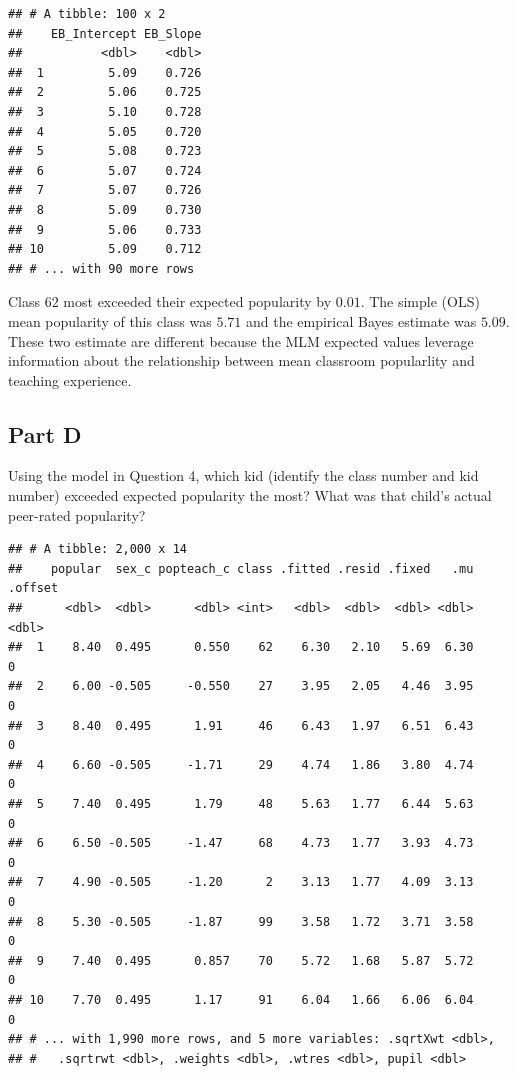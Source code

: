\documentclass[]{article}
\newenvironment{Shaded}{\begin{snugshade}}{\end{snugshade}}
\newcommand{\KeywordTok}[1]{\textcolor[rgb]{0.13,0.29,0.53}{\textbf{#1}}}
\newcommand{\DataTypeTok}[1]{\textcolor[rgb]{0.13,0.29,0.53}{#1}}
\newcommand{\StringTok}[1]{\textcolor[rgb]{0.31,0.60,0.02}{#1}}
\newcommand{\OperatorTok}[1]{\textcolor[rgb]{0.81,0.36,0.00}{\textbf{#1}}}
\newcommand{\NormalTok}[1]{#1}
\begin{document}
\begin{verbatim}
## # A tibble: 100 x 2
##    EB_Intercept EB_Slope
##           <dbl>    <dbl>
##  1         5.09    0.726
##  2         5.06    0.725
##  3         5.10    0.728
##  4         5.05    0.720
##  5         5.08    0.723
##  6         5.07    0.724
##  7         5.07    0.726
##  8         5.09    0.730
##  9         5.06    0.733
## 10         5.09    0.712
## # ... with 90 more rows
\end{verbatim}

Class \(62\) most exceeded their expected popularity by \(0.01\). The
simple (OLS) mean popularity of this class was \(5.71\) and the
empirical Bayes estimate was \(5.09\). These two estimate are different
because the MLM expected values leverage information about the
relationship between mean classroom popularlity and teaching experience.

\subsection{Part D}\label{part-d-3}

Using the model in Question 4, which kid (identify the class number and
kid number) exceeded expected popularity the most? What was that child's
actual peer-rated popularity?

\begin{Shaded}
\end{Shaded}

\begin{verbatim}
## # A tibble: 2,000 x 14
##    popular  sex_c popteach_c class .fitted .resid .fixed   .mu .offset
##      <dbl>  <dbl>      <dbl> <int>   <dbl>  <dbl>  <dbl> <dbl>   <dbl>
##  1    8.40  0.495      0.550    62    6.30   2.10   5.69  6.30       0
##  2    6.00 -0.505     -0.550    27    3.95   2.05   4.46  3.95       0
##  3    8.40  0.495      1.91     46    6.43   1.97   6.51  6.43       0
##  4    6.60 -0.505     -1.71     29    4.74   1.86   3.80  4.74       0
##  5    7.40  0.495      1.79     48    5.63   1.77   6.44  5.63       0
##  6    6.50 -0.505     -1.47     68    4.73   1.77   3.93  4.73       0
##  7    4.90 -0.505     -1.20      2    3.13   1.77   4.09  3.13       0
##  8    5.30 -0.505     -1.87     99    3.58   1.72   3.71  3.58       0
##  9    7.40  0.495      0.857    70    5.72   1.68   5.87  5.72       0
## 10    7.70  0.495      1.17     91    6.04   1.66   6.06  6.04       0
## # ... with 1,990 more rows, and 5 more variables: .sqrtXwt <dbl>,
## #   .sqrtrwt <dbl>, .weights <dbl>, .wtres <dbl>, pupil <dbl>
\end{verbatim}
\end{document}
